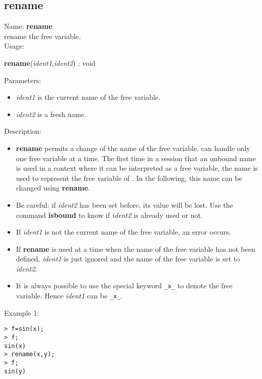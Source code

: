 \subsection{rename}
\label{labrename}
\noindent Name: \textbf{rename}\\
rename the free variable.\\
\noindent Usage: 
\begin{center}
\textbf{rename}(\emph{ident1},\emph{ident2}) : \textsf{void}\\
\end{center}
Parameters: 
\begin{itemize}
\item \emph{ident1} is the current name of the free variable.
\item \emph{ident2} is a fresh name.
\end{itemize}
\noindent Description: \begin{itemize}

\item \textbf{rename} permits a change of the name of the free variable. \sollya can handle
   only one free variable at a time. The first time in a session that an
   unbound name is used in a context where it can be interpreted as a free
   variable, the name is used to represent the free variable of \sollya. In the
   following, this name can be changed using \textbf{rename}.

\item Be careful: if \emph{ident2} has been set before, its value will be lost. Use
   the command \textbf{isbound} to know if \emph{ident2} is already used or not.

\item If \emph{ident1} is not the current name of the free variable, an error occurs.

\item If \textbf{rename} is used at a time when the name of the free variable has not been
   defined, \emph{ident1} is just ignored and the name of the free variable is set
   to \emph{ident2}.

\item It is always possible to use the special keyword \verb|_x_| to denote the free
   variable. Hence \emph{ident1} can be \verb|_x_|.
\end{itemize}
\noindent Example 1: 
\begin{center}\begin{minipage}{15cm}\begin{Verbatim}[frame=single]
> f=sin(x);
> f;
sin(x)
> rename(x,y);
> f;
sin(y)
\end{Verbatim}
\end{minipage}\end{center}
